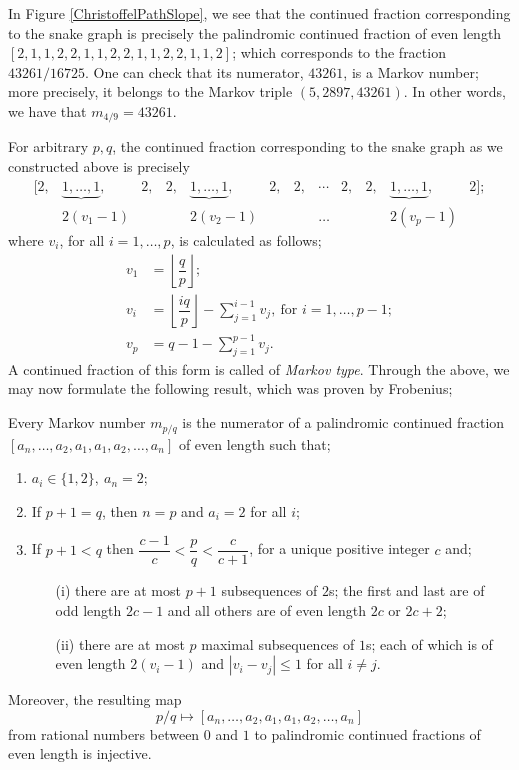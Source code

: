 In Figure \ref{ChristoffelPathSlope}, we see that the continued fraction corresponding to the snake graph is precisely the palindromic continued fraction of even length $[2,1,1,2,2,1,1,2,2,1,1,2,2,1,1,2]$; which corresponds to the fraction $43261/16725$. One can check that its numerator, $43261$, is a Markov number; more precisely, it belongs to the Markov triple $(5,2897,43261)$. In other words, we have that $m_{4/9} = 43261$. 

For arbitrary $p,q$, the continued fraction corresponding to the snake graph as we constructed above is precisely
\begin{equation*}
        \begin{array}{cccccccccccccccccccccccc}
  [2,& \underbrace{1,\dots,1},&  2,& 2,&  \underbrace{1,\dots,1},& 2,& 2, & \cdots & 2,& 2,& \underbrace{1,\dots,1},& 2] ;  \\
 &2(v_1 -1) & & &2(v_2-1)& & &\ldots& & &2(v_p-1) & 
\end{array}
    \end{equation*}
where $v_i$, for all $i = 1,\dots,p$, is calculated as follows;
\begin{align*}
    v_1 &= \left\lfloor \dfrac{q}{p}\right\rfloor; \\
    v_i &= \left\lfloor \dfrac{iq}{p}\right\rfloor - \sum_{j=1}^{i-1}v_j, \ \text{for } i = 1,\dots,p-1; \\
    v_p &= q - 1 - \sum_{j=1}^{p-1} v_j.
\end{align*}
A continued fraction of this form is called of \emph{Markov type}. Through the above, we may now formulate the following result, which was proven by Frobenius;
\begin{theorem}\label{MarkovThm}
Every Markov number $m_{p/q}$ is the numerator of a palindromic continued fraction $[a_n,\dots,a_2,a_1,a_1,a_2,\dots,a_n]$ of even length such that;
\begin{enumerate}
    \item $a_i \in \{1,2\}, \ a_n = 2$; 
    \item If $p+1 = q$, then $n = p$ and $a_i = 2$ for all $i$; 
    \item If $p+1 < q$ then $\dfrac{c-1}{c} < \dfrac{p}{q} < \dfrac{c}{c+1}$, for a unique positive integer $c$ and;
    \begin{itemize}
        \item[(i)] there are at most $p+1$ subsequences of $2$s; the first and last are of odd length $2c-1$ and all others are of even length $2c$ or $2c+2$;
        \item[(ii)] there are at most $p$ maximal subsequences of $1$s; each of which is of even length $2(v_i-1)$ and $|v_i - v_j| \leq 1$ for all $i \neq j$.
    \end{itemize}
\end{enumerate}
Moreover, the resulting map
\begin{equation*}
    p/q \mapsto [a_n,\dots,a_2,a_1,a_1,a_2,\dots,a_n]
\end{equation*}
    from rational numbers between $0$ and $1$ to palindromic continued fractions of even length is injective.
\end{theorem}
